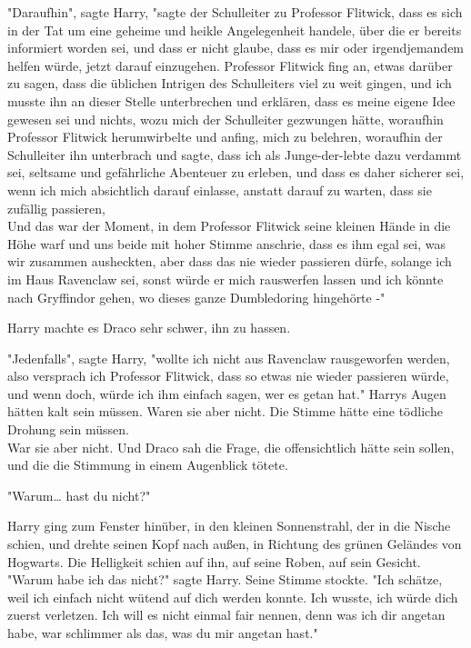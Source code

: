{"Daraufhin", sagte Harry, "sagte der Schulleiter zu Professor Flitwick, dass es sich in der Tat um eine geheime und heikle Angelegenheit handele, über die er bereits informiert worden sei, und dass er nicht glaube, dass es mir oder irgendjemandem helfen würde, jetzt darauf einzugehen. Professor Flitwick fing an, etwas darüber zu sagen, dass die üblichen Intrigen des Schulleiters viel zu weit gingen, und ich musste ihn an dieser Stelle unterbrechen und erklären, dass es meine eigene Idee gewesen sei und nichts, wozu mich der Schulleiter gezwungen hätte, woraufhin Professor Flitwick herumwirbelte und anfing, mich zu belehren, woraufhin der Schulleiter ihn unterbrach und sagte, dass ich als Junge-der-lebte dazu verdammt sei, seltsame und gefährliche Abenteuer zu erleben, und dass es daher sicherer sei, wenn ich mich absichtlich darauf einlasse, anstatt darauf zu warten, dass sie zufällig passieren,\\ Und das war der Moment, in dem Professor Flitwick seine kleinen Hände in die Höhe warf und uns beide mit hoher Stimme anschrie, dass es ihm egal sei, was wir zusammen ausheckten, aber dass das nie wieder passieren dürfe, solange ich im Haus Ravenclaw sei, sonst würde er mich rauswerfen lassen und ich könnte nach Gryffindor gehen, wo dieses ganze Dumbledoring hingehörte -"

Harry machte es Draco sehr schwer, ihn zu hassen.

"Jedenfalls", sagte Harry, "wollte ich nicht aus Ravenclaw rausgeworfen werden, also versprach ich Professor Flitwick, dass so etwas nie wieder passieren würde, und wenn doch, würde ich ihm einfach sagen, wer es getan hat." Harrys Augen hätten kalt sein müssen. Waren sie aber nicht. Die Stimme hätte eine tödliche Drohung sein müssen.\\ War sie aber nicht. Und Draco sah die Frage, die offensichtlich hätte sein sollen, und die die Stimmung in einem Augenblick tötete.

"Warum… hast du nicht?"

Harry ging zum Fenster hinüber, in den kleinen Sonnenstrahl, der in die Nische schien, und drehte seinen Kopf nach außen, in Richtung des grünen Geländes von Hogwarts. Die Helligkeit schien auf ihn, auf seine Roben, auf sein Gesicht.\\ "Warum habe ich das nicht?" sagte Harry. Seine Stimme stockte. "Ich schätze, weil ich einfach nicht wütend auf dich werden konnte. Ich wusste, ich würde dich zuerst verletzen. Ich will es nicht einmal fair nennen, denn was ich dir angetan habe, war schlimmer als das, was du mir angetan hast."

}

